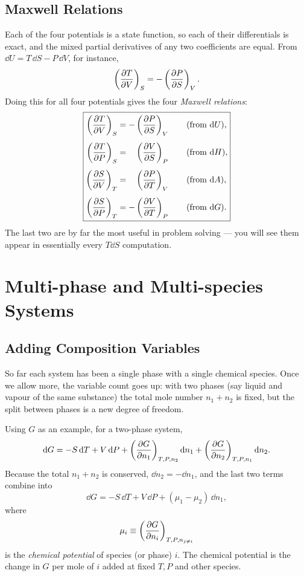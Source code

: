 \subsection{Maxwell Relations}

Each of the four potentials is a state function, so each of their differentials is exact, and the mixed partial derivatives of any two coefficients are equal. From $\dd U = T\,\dd S - P\,\dd V$, for instance,
\[
    \left(\dfrac{\partial T}{\partial V}\right)_S = -\left(\dfrac{\partial P}{\partial S}\right)_V.
\]
Doing this for all four potentials gives the four \emph{Maxwell relations}:
\[
    \boxed{\begin{aligned}
        \left(\dfrac{\partial T}{\partial V}\right)_S &= -\left(\dfrac{\partial P}{\partial S}\right)_V \qquad (\text{from } \mathrm{d} U),\\[4pt]
        \left(\dfrac{\partial T}{\partial P}\right)_S &= \phantom{-}\left(\dfrac{\partial V}{\partial S}\right)_P \qquad (\text{from } \mathrm{d} H),\\[4pt]
        \left(\dfrac{\partial S}{\partial V}\right)_T &= \phantom{-}\left(\dfrac{\partial P}{\partial T}\right)_V \qquad (\text{from } \mathrm{d} A),\\[4pt]
        \left(\dfrac{\partial S}{\partial P}\right)_T &= -\left(\dfrac{\partial V}{\partial T}\right)_P \qquad (\text{from } \mathrm{d} G).
    \end{aligned}}
\]
The last two are by far the most useful in problem solving --- you will see them appear in essentially every $T\dd S$ computation.

\section{Multi-phase and Multi-species Systems}

\subsection{Adding Composition Variables}

So far each system has been a single phase with a single chemical species. Once we allow more, the variable count goes up: with two phases (say liquid and vapour of the same substance) the total mole number $n_1 + n_2$ is fixed, but the split between phases is a new degree of freedom.

Using $G$ as an example, for a two-phase system,
\[
    \mathrm{d} G = -S\,\mathrm{d} T + V\,\mathrm{d} P + \left(\dfrac{\partial G}{\partial n_1}\right)_{T,P,n_2}\mathrm{d} n_1 + \left(\dfrac{\partial G}{\partial n_2}\right)_{T,P,n_1}\mathrm{d} n_2.
\]
Because the total $n_1 + n_2$ is conserved, $\dd n_2 = -\dd n_1$, and the last two terms combine into
\[
    \dd G = -S\,\dd T + V\,\dd P + (\mu_1 - \mu_2)\,\dd n_1,
\]
where
\[
    \mu_i \equiv \left(\dfrac{\partial G}{\partial n_i}\right)_{T,P,n_{j\neq i}}
\]
is the \emph{chemical potential} of species (or phase) $i$. The chemical potential is the change in $G$ per mole of $i$ added at fixed $T,P$ and other species.

